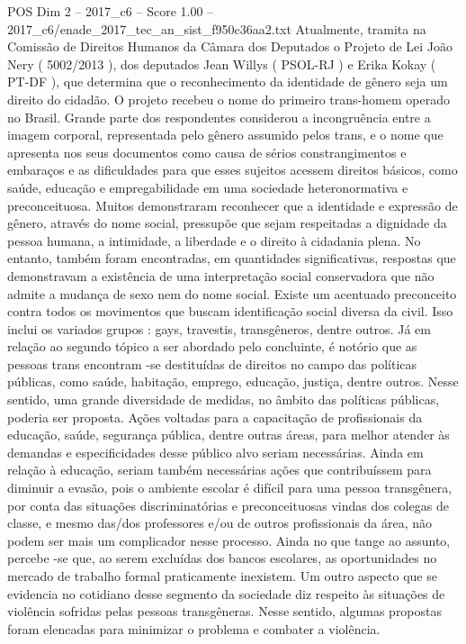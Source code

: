 \begin{textsample}{POS Dim 2 – 2017\_c6 – Score 1.00 – 2017\_c6/enade\_2017\_tec\_an\_sist\_f950c36aa2.txt}
Atualmente, tramita na Comissão de Direitos Humanos da Câmara dos Deputados o Projeto de Lei João Nery ( 5002/2013 ), dos deputados Jean Willys ( PSOL-RJ ) e Erika Kokay ( PT-DF ), que determina que o reconhecimento da identidade de gênero seja um direito do cidadão.
O projeto recebeu o nome do primeiro trans-homem operado no Brasil.
Grande parte dos respondentes considerou a incongruência entre a imagem corporal, representada pelo gênero assumido pelos trans, e o nome que apresenta nos seus documentos como causa de sérios constrangimentos e embaraços e as dificuldades para que esses sujeitos acessem direitos básicos, como saúde, educação e empregabilidade em uma sociedade heteronormativa e preconceituosa.
Muitos demonstraram reconhecer que a identidade e expressão de gênero, através do nome social, pressupõe que sejam respeitadas a dignidade da pessoa humana, a intimidade, a liberdade e o direito à cidadania plena.
No entanto, também foram encontradas, em quantidades significativas, respostas que demonstravam a existência de uma interpretação social conservadora que não admite a mudança de sexo nem do nome social.
Existe um acentuado preconceito contra todos os movimentos que buscam identificação social diversa da civil.
Isso inclui os variados grupos : gays, travestis, transgêneros, dentre outros.
Já em relação ao segundo tópico a ser abordado pelo concluinte, é notório que as pessoas trans encontram -se destituídas de direitos no campo das políticas públicas, como saúde, habitação, emprego, educação, justiça, dentre outros.
Nesse sentido, uma grande diversidade de medidas, no âmbito das políticas públicas, poderia ser proposta.
Ações voltadas para a capacitação de profissionais da educação, saúde, segurança pública, dentre outras áreas, para melhor atender às demandas e especificidades desse público alvo seriam necessárias.
Ainda em relação à educação, seriam também necessárias ações que contribuíssem para diminuir a evasão, pois o ambiente escolar é difícil para uma pessoa transgênera, por conta das situações discriminatórias e preconceituosas vindas dos colegas de classe, e mesmo das/dos professores e/ou de outros profissionais da área, não podem ser mais um complicador nesse processo.
Ainda no que tange ao assunto, percebe -se que, ao serem excluídas dos bancos escolares, as oportunidades no mercado de trabalho formal praticamente inexistem.
Um outro aspecto que se evidencia no cotidiano desse segmento da sociedade diz respeito às situações de violência sofridas pelas pessoas transgêneras.
Nesse sentido, algumas propostas foram elencadas para minimizar o problema e combater a violência.

\end{textsample}

